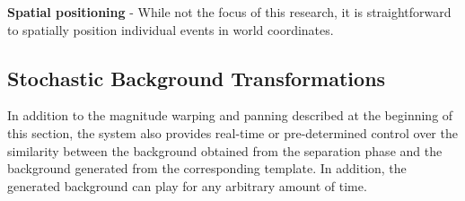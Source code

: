 \documentclass{acmsiggraph}               %
\begin{document}
\textbf{Spatial positioning} - While not the focus of this research, it 
is straightforward to spatially position individual events in world 
coordinates.




\subsection{Stochastic Background Transformations}

In addition to the magnitude warping and panning described at the 
beginning of this section, the system also provides real-time or 
pre-determined control over the similarity between the background 
obtained from the separation phase and the background generated from 
the corresponding template. In addition, the generated background can play for any 
arbitrary amount of time.

\end{document}
